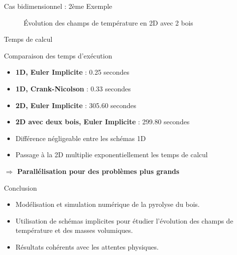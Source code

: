 \documentclass{beamer}
\begin{document}
\begin{frame}{Cas bidimensionnel : 2ème Exemple}

    \begin{figure}
        \centering
        \caption{\footnotesize Évolution des champs de température en 2D avec 2 bois}
    \end{figure}
\end{frame}

\begin{frame}{Temps de calcul}
    \begin{block}{Comparaison des temps d'exécution}
        \begin{itemize}
            \item \textbf{1D, Euler Implicite} : 0.25 secondes
            \item \textbf{1D, Crank-Nicolson} : 0.33 secondes
            \item \textbf{2D, Euler Implicite} : 305.60 secondes
            \item \textbf{2D avec deux bois, Euler Implicite} : 299.80 secondes
        \end{itemize}
    \end{block}
    \begin{itemize}
        \item Différence négligeable entre les schémas 1D
        \item Passage à la 2D multiplie exponentiellement les temps de calcul
    \end{itemize}
    \begin{block}{}
        \textbf{$\Longrightarrow$ Parallélisation pour des problèmes plus grands}
    \end{block}
\end{frame}

\begin{frame}{Conclusion}
    \begin{itemize}
        \item Modélisation et simulation numérique de la pyrolyse du bois.
        \item Utilisation de schémas implicites pour étudier l'évolution des champs de température et des masses volumiques.
        \item Résultats cohérents avec les attentes physiques.
    \end{itemize}
\end{frame}
\end{document}
